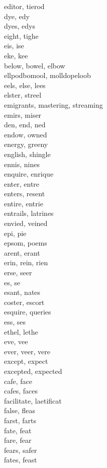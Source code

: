 editor, tierod\\
dye, edy\\
dyes, edys\\
eight, tighe\\
eis, ise\\
eke, kee\\
below, bowel, elbow\\
ellpodbomool, molldopeloob\\
eels, else, lees\\
elster, streel\\
emigrants, mastering, streaming\\
emirs, miser\\
den, end, ned\\
endow, owned\\
energy, greeny\\
english, shingle\\
ennis, nines\\
enquire, enrique\\
enter, entre\\
enters, resent\\
entire, entrie\\
entrails, latrines\\
envied, veined\\
epi, pie\\
epsom, poems\\
arent, erant\\
erin, rein, rien\\
erse, seer\\
es, se\\
esant, nates\\
coster, escort\\
esquire, queries\\
ess, ses\\
ethel, lethe\\
eve, vee\\
ever, veer, vere\\
except, expect\\
excepted, expected\\
cafe, face\\
cafes, faces\\
facilitate, laetificat\\
false, fleas\\
farst, farts\\
fate, feat\\
fare, fear\\
fears, safer\\
fates, feast\\
